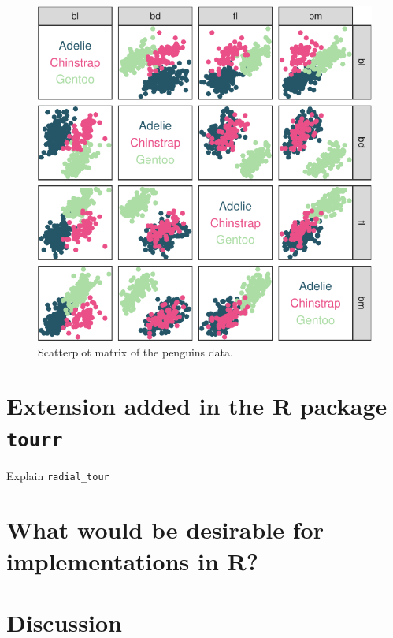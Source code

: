 \documentclass[]{interact}
\theoremstyle{plain}%
\theoremstyle{definition}
\theoremstyle{remark}
\begin{document}
\begin{figure}
\includegraphics[width=1\linewidth]{paper_files/figure-latex/penguins-scatmat-1} \caption{Scatterplot matrix of the penguins data.}\label{fig:penguins-scatmat}
\end{figure}

\hypertarget{extension-added-in-the-r-package-tourr}{%
\section{\texorpdfstring{Extension added in the R package
\texttt{tourr}}{Extension added in the R package tourr}}\label{extension-added-in-the-r-package-tourr}}

Explain \texttt{radial\_tour}

\hypertarget{what-would-be-desirable-for-implementations-in-r}{%
\section{What would be desirable for implementations in
R?}\label{what-would-be-desirable-for-implementations-in-r}}

\hypertarget{sec:discussion}{%
\section{Discussion}\label{sec:discussion}}
\end{document}
